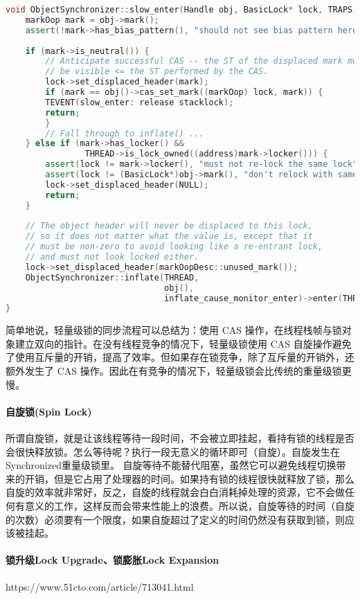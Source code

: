 \documentclass[../../../interview-questions.tex]{subfiles}
\begin{document}
\begin{lstlisting}[language=C++]
void ObjectSynchronizer::slow_enter(Handle obj, BasicLock* lock, TRAPS) {
    markOop mark = obj->mark();
    assert(!mark->has_bias_pattern(), "should not see bias pattern here");
    
    if (mark->is_neutral()) {
        // Anticipate successful CAS -- the ST of the displaced mark must
        // be visible <= the ST performed by the CAS.
        lock->set_displaced_header(mark);
        if (mark == obj()->cas_set_mark((markOop) lock, mark)) {
        TEVENT(slow_enter: release stacklock);
        return;
        }
        // Fall through to inflate() ...
    } else if (mark->has_locker() &&
                THREAD->is_lock_owned((address)mark->locker())) {
        assert(lock != mark->locker(), "must not re-lock the same lock");
        assert(lock != (BasicLock*)obj->mark(), "don't relock with same BasicLock");
        lock->set_displaced_header(NULL);
        return;
    }
    
    // The object header will never be displaced to this lock,
    // so it does not matter what the value is, except that it
    // must be non-zero to avoid looking like a re-entrant lock,
    // and must not look locked either.
    lock->set_displaced_header(markOopDesc::unused_mark());
    ObjectSynchronizer::inflate(THREAD,
                                obj(),
                                inflate_cause_monitor_enter)->enter(THREAD);
}
\end{lstlisting}

简单地说，轻量级锁的同步流程可以总结为：使用 CAS 操作，在线程栈帧与锁对象建立双向的指针。在没有线程竞争的情况下，轻量级锁使用 CAS 自旋操作避免了使用互斥量的开销，提高了效率。但如果存在锁竞争，除了互斥量的开销外，还额外发生了 CAS 操作。因此在有竞争的情况下，轻量级锁会比传统的重量级锁更慢。

\paragraph{自旋锁(Spin Lock)}所谓自旋锁，就是让该线程等待一段时间，不会被立即挂起，看持有锁的线程是否会很快释放锁。怎么等待呢？执行一段无意义的循环即可（自旋）。自旋发生在Synchronized重量级锁里。
自旋等待不能替代阻塞，虽然它可以避免线程切换带来的开销，但是它占用了处理器的时间。如果持有锁的线程很快就释放了锁，那么自旋的效率就非常好，反之，自旋的线程就会白白消耗掉处理的资源，它不会做任何有意义的工作，这样反而会带来性能上的浪费。所以说，自旋等待的时间（自旋的次数）必须要有一个限度，如果自旋超过了定义的时间仍然没有获取到锁，则应该被挂起。

\paragraph{锁升级Lock Upgrade、锁膨胀Lock Expansion}

https://www.51cto.com/article/713041.html
\end{document}
